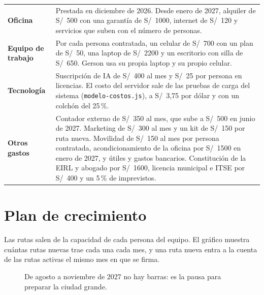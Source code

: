 \documentclass[10.5pt,a4paper]{article}
\begin{document}
{\begin{tabularx}{\linewidth}{@{}>{\bfseries}p{3.3cm}X@{}}
Oficina & Prestada en diciembre de 2026. Desde enero de 2027, alquiler de S/~500 con una garantía de S/~1000, internet de S/~120 y servicios que suben con el número de personas.\\
Equipo de trabajo & Por cada persona contratada, un celular de S/~700 con un plan de S/~50, una laptop de S/~2200 y un escritorio con silla de S/~650. Gerson usa su propia laptop y su propio celular.\\
Tecnología & Suscripción de IA de S/~400 al mes y S/~25 por persona en licencias. El costo del servidor sale de las pruebas de carga del sistema (\texttt{modelo-costos.js}), a S/~3,75 por dólar y con un colchón del 25\,\%.\\
Otros gastos & Contador externo de S/~350 al mes, que sube a S/~500 en junio de 2027. Marketing de S/~300 al mes y un kit de S/~150 por ruta nueva. Movilidad de S/~150 al mes por persona contratada, acondicionamiento de la oficina por S/~1500 en enero de 2027, y útiles y gastos bancarios. Constitución de la EIRL y abogado por S/~1600, licencia municipal e ITSE por S/~400 y un 5\,\% de imprevistos.\\
\bottomrule
\end{tabularx}}

\section{Plan de crecimiento}

Las rutas salen de la capacidad de cada persona del equipo. El gráfico muestra cuántas rutas nuevas trae cada una cada mes, y una ruta nueva entra a la cuenta de las rutas activas el mismo mes en que se firma.

\begin{figure}[H]
\caption{De agosto a noviembre de 2027 no hay barras: es la pausa para preparar la ciudad grande.}
\end{figure}
\end{document}
